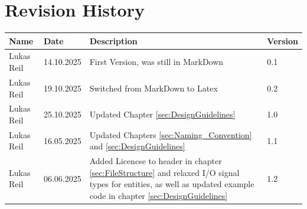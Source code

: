 


\chapter*{Revision History}

\begin{center}
	\begin{tabular}{ |p{4cm}|p{2.5cm}|p{5cm}|p{2cm}| } 
		\hline
		\rowcolor{black!3}
		Name & Date & Description & Version \\ 
		\hline
		Lukas Reil & 14.10.2025 & First Version, was still in MarkDown & 0.1\\
		Lukas Reil & 19.10.2025 & Switched from MarkDown to Latex & 0.2\\ 
		Lukas Reil & 25.10.2025 & Updated Chapter \ref{sec:DesignGuidelines} & 1.0\\
		Lukas Reil & 16.05.2025 & Updated Chapters \ref{sec:Naming_Convention} and \ref{sec:DesignGuidelines} & 1.1\\
		Lukas Reil & 06.06.2025 & Added Licencse to header in chapter \ref{sec:FileStructure} and relaxed I/O signal types for entities, as well as updated example code in chapter \ref{sec:DesignGuidelines} & 1.2\\
		\hline
	\end{tabular}
\end{center}

